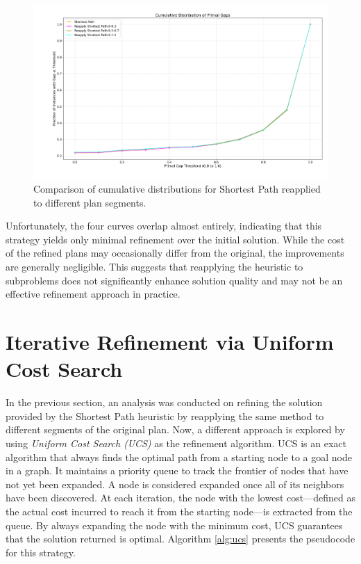 \begin{figure}[ht]
	\centering
	\includegraphics[width=\textwidth]{images/reapply_full.png}
	\caption{Comparison of cumulative distributions for Shortest Path reapplied to different plan segments.}
	\label{fig:reapply}
\end{figure}

Unfortunately, the four curves overlap almost entirely, indicating that this strategy yields only minimal refinement over the initial solution.
While the cost of the refined plans may occasionally differ from the original, the improvements are generally negligible.
This suggests that reapplying the heuristic to subproblems does not significantly enhance solution quality and may not be an effective
refinement approach in practice.

\section{Iterative Refinement via Uniform Cost Search}
In the previous section, an analysis was conducted on refining the solution provided by the Shortest Path heuristic by reapplying the same method
to different segments of the original plan.
Now, a different approach is explored by using \textit{Uniform Cost Search (UCS)} \cite{felner2011position} as the refinement algorithm.
\textsc{UCS} is an exact algorithm that always finds the optimal path from a starting node to a goal node in a graph.
It maintains a priority queue to track the frontier of nodes that have not yet been expanded. A node is considered expanded once all of its
neighbors have been discovered.
At each iteration, the node with the lowest cost—defined as the actual cost incurred to reach it from the starting node—is extracted from the queue.
By always expanding the node with the minimum cost, \textsc{UCS} guarantees that the solution returned is optimal.
Algorithm \ref{alg:ucs} presents the pseudocode for this strategy.

